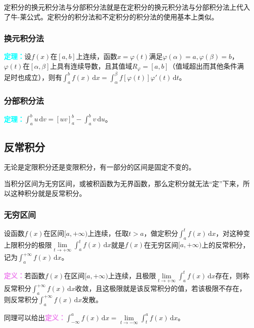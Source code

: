 \documentclass[UTF8, 12pt]{ctexart}
\begin{document}
定积分的换元积分法与分部积分法就是在定积分的换元积分法与分部积分法上代入了牛-莱公式。定积分的积分法和不定积分的积分法的使用基本上类似。

\subsubsection{换元积分法}

\textcolor{aqua}{\textbf{定理：}}设$f(x)$在$[a,b]$上连续，函数$x=\varphi(t)$满足$\varphi(\alpha)=a,\varphi(\beta)=b$，$\varphi(t)$在$[\alpha,\beta]$上具有连续导数，且其值域$R_\varphi=[a,b]$（值域超出而其他条件满足时也成立），则有$\int_a^bf(x)\,\textrm{d}x=\int_\alpha^\beta f[\varphi(t)]\varphi'(t)\,\textrm{d}t$。

\subsubsection{分部积分法}

\textcolor{aqua}{\textbf{定理：}}$\int_a^bu\,\textrm{d}v=[uv]_a^b-\int_a^bv\,\textrm{d}u$。

\subsection{反常积分}

无论是定限积分还是变限积分，有一部分的区间是固定不变的。

当积分区间为无穷区间，或被积函数为无界函数，那么定积分就无法“定”下来，所以这种积分就是反常积分。

\subsubsection{无穷区间}

设函数$f(x)$在区间$[a,+\infty)$上连续，任取$t>a$，做定积分$\int_a^tf(x)\,\textrm{d}x$，对这种变上限积分的极限$\lim\limits_{t\to+\infty}\int_a^tf(x)\,\textrm{d}x$就是$f(x)$在无穷区间$[a,+\infty)$上的反常积分，记为$\int_a^{+\infty}f(x)\,\textrm{d}x$。

\textcolor{violet}{\textbf{定义：}}若函数$f(x)$在区间$[a,+\infty)$上连续，且极限$\lim\limits_{t\to+\infty}\int_a^tf(x)\,\textrm{d}x$存在，则称反常积分$\int_a^{+\infty}f(x)\,\textrm{d}x$收敛，且这极限就是该反常积分的值，若该极限不存在，则反常积分$\int_a^{+\infty}f(x)\,\textrm{d}x$发散。

同理可以给出\textcolor{violet}{\textbf{定义：}}$\int_{-\infty}^af(x)\,\textrm{d}x=\lim\limits_{t\to-\infty}\int_t^af(x)\,\textrm{d}x$。
\end{document}
